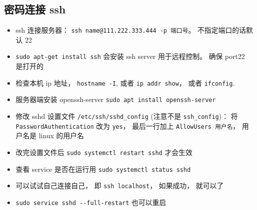 
\begin{issues}
\issueDraft
\end{issues}

\subsection{密码连接 ssh}
\begin{itemize}
\item ssh 连接服务器： \verb|ssh name@111.222.333.444 -p 端口号|。 不指定端口的话默认 22
\item \verb`sudo apt-get install ssh` 会安装 ssh server 用于远程控制。 确保 port22 是打开的
\item 检查本机 ip 地址， \verb`hostname -I`, 或者 \verb`ip addr show`， 或者 \verb|ifconfig|.
\item 服务器端安装 openssh-server \verb`sudo apt install openssh-server`
\item 修改 sshd 设置文件 \verb`/etc/ssh/sshd_config` (注意不是 \verb`ssh_config`)： 将 \verb`PasswordAuthentication` 改为 \verb`yes`， 最后一行加上 \verb`AllowUsers 用户名`， 用户名是 linux 的用户名
\item 改完设置文件后 \verb`sudo systemctl restart sshd` 才会生效
\item 查看 service 是否在运行用  \verb`sudo systemctl status sshd`
\item 可以试试自己连接自己， 即 \verb`ssh localhost`， 如果成功， 就可以了
\item \verb|sudo service sshd --full-restart| 也可以重启
\end{itemize}

